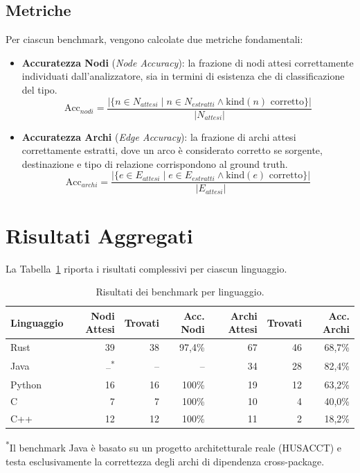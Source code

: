 \subsection{Metriche}
Per ciascun benchmark, vengono calcolate due metriche fondamentali:
\begin{itemize}
  \item \textbf{Accuratezza Nodi} (\textit{Node Accuracy}): la
    frazione di nodi attesi correttamente individuati dall'analizzatore,
    sia in termini di esistenza che di classificazione del tipo.
    $$\text{Acc}_{nodi} = \frac{|\{n \in N_{attesi} \mid n \in
    N_{estratti} \land \text{kind}(n) \text{ corretto}\}|}{|N_{attesi}|}$$
  \item \textbf{Accuratezza Archi} (\textit{Edge Accuracy}): la
    frazione di archi attesi correttamente estratti, dove un arco è
    considerato corretto se sorgente, destinazione e tipo di relazione
    corrispondono al ground truth.
    $$\text{Acc}_{archi} = \frac{|\{e \in E_{attesi} \mid e \in
    E_{estratti} \land \text{kind}(e) \text{ corretto}\}|}{|E_{attesi}|}$$
\end{itemize}

\section{Risultati Aggregati}
La Tabella~\ref{tab:risultati-aggregati} riporta i risultati
complessivi per ciascun linguaggio.

\begin{table}[ht]
  \centering
  \caption{Risultati dei benchmark per linguaggio.}
  \label{tab:risultati-aggregati}
  \begin{tabular}{l r r r r r r}
    \hline
    \textbf{Linguaggio} & \textbf{Nodi Attesi} & \textbf{Trovati} &
    \textbf{Acc. Nodi} & \textbf{Archi Attesi} & \textbf{Trovati} &
    \textbf{Acc. Archi} \\
    \hline
    Rust   & 39 & 38 & 97{,}4\% & 67 & 46 & 68{,}7\% \\
    Java   & --\textsuperscript{*} & -- & -- & 34 & 28 & 82{,}4\% \\
    Python & 16 & 16 & 100\%    & 19 & 12 & 63{,}2\% \\
    C      &  7 &  7 & 100\%    & 10 &  4 & 40{,}0\% \\
    C++    & 12 & 12 & 100\%    & 11 &  2 & 18{,}2\% \\
    \hline
  \end{tabular}
  \begin{flushleft}
    \textsuperscript{*}\footnotesize{Il benchmark Java è basato su un
      progetto architetturale reale (HUSACCT) e testa esclusivamente la
    correttezza degli archi di dipendenza cross-package.}
  \end{flushleft}
\end{table}

